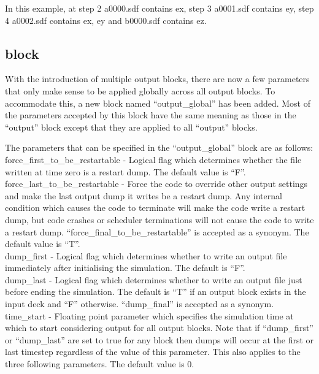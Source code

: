 In this example, at step 2 a0000.sdf contains ex, step 3 a0001.sdf
contains ey, step 4 a0002.sdf contains ex, ey and b0000.sdf
contains ez.


\subsection{ block}
\label{sec:output_global_block}

With the introduction of multiple output blocks, there are now a few parameters
that only make sense to be applied globally across all output blocks. To
accommodate this, a new block named ``output\_global'' has been added.
Most of the parameters accepted by this block have the same meaning as those
in the ``output'' block except that they are applied to all ``output'' blocks.

The parameters that can be specified in the ``output\_global'' block are
as follows:\\

{\emphtext force\_first\_to\_be\_restartable} - Logical flag which determines
  whether the file written at time zero is a restart dump. The default value
  is ``F''.\\

{\emphtext force\_last\_to\_be\_restartable} - Force the code to override
other output settings and make the last output dump it writes be a restart
dump. Any internal condition which causes the code to terminate will make the
code write a restart dump, but code crashes or scheduler terminations will not
cause the code to write a restart dump.
``force\_final\_to\_be\_restartable'' is accepted as a synonym.
The default value is ``T''.\\

{\emphtext dump\_first} - Logical flag which determines whether to write an
  output file immediately after initialising the simulation. The default is
  ``F''.\\

{\emphtext dump\_last} - Logical flag which determines whether to write an
  output file just before ending the simulation. The default is ``T'' if
  an output block exists in the input deck and ``F'' otherwise.
  ``dump\_final'' is accepted as a synonym.\\

{\emphtext time\_start} - Floating point parameter which specifies the
  simulation time at which to start considering output for all output
  blocks. Note
  that if ``dump\_first'' or ``dump\_last'' are set to true for any block then
  dumps will occur at the first or last timestep regardless of the value of this
  parameter. This also applies to the three following parameters.
  The default value is 0.\\

